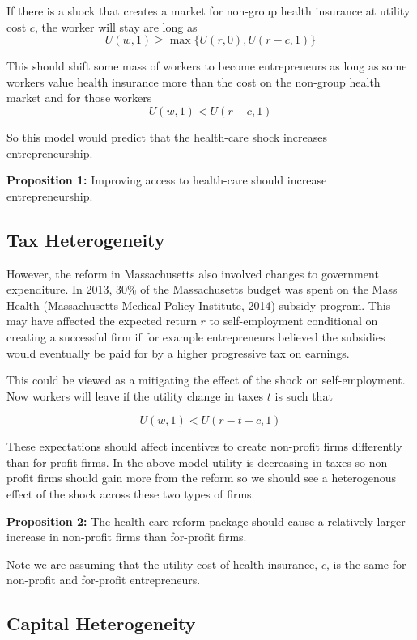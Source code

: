 \documentclass[12pt]{article}
\begin{document}
If there is a shock that creates a market for non-group health insurance at utility cost $c$, the worker will stay are long as
$$U(w,1) \ge \max\{U(r,0),U(r-c,1)\}$$

This should shift some mass of workers to become entrepreneurs as long as some workers value health insurance more than the cost on the non-group health market and for those workers
$$U(w,1) < U(r-c,1)$$

So this model would predict that the health-care shock increases entrepreneurship. 

\textbf{Proposition 1:} 
Improving access to health-care should increase entrepreneurship. 

\subsection{Tax Heterogeneity}

However, the reform in Massachusetts also involved changes to government expenditure. In 2013, 30\% of the Massachusetts budget was spent on the Mass Health (Massachusetts Medical Policy Institute, 2014) \nocite{masshealth2014} subsidy program. This may have affected the expected return $r$ to self-employment conditional on creating a successful firm if for example entrepreneurs believed the subsidies would eventually be paid for by a higher progressive tax on earnings.

This could be viewed as a mitigating the effect of the shock on self-employment. Now workers will leave if the utility change in taxes $t$ is such that

$$U(w,1) < U(r-t-c,1)$$

These expectations should affect incentives to create non-profit firms differently than for-profit firms. In the above model utility is decreasing in taxes so non-profit firms should gain more from the reform so we should see a heterogenous effect of the shock across these two types of firms.  

\textbf{Proposition 2:} 
The health care reform package should cause a relatively larger increase in non-profit firms than for-profit firms. 

Note we are assuming that the utility cost of health insurance, $c$, is the same for non-profit and for-profit entrepreneurs.  

\subsection{Capital Heterogeneity}
\end{document}
